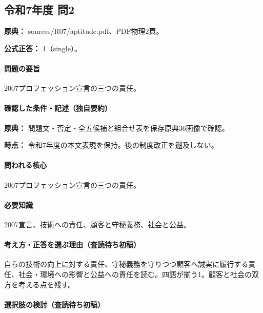 \subsection{令和7年度 問2}
\label{q:r07-reg-apt-02}

\noindent\textbf{原典：} sources/R07/aptitude.pdf、PDF物理2頁。

\textbf{公式正答：} 1（single）。

\paragraph{問題の要旨} 2007プロフェッション宣言の三つの責任。

\paragraph{確認した条件・記述（独自要約）}\mbox{}\par

\noindent\textbf{原典：} 問題文・否定・全五候補と組合せ表を保存原典36画像で確認。\par

\noindent\textbf{時点：} 令和7年度の本文表現を保持。後の制度改正を遡及しない。\par

\paragraph{問われる核心} 2007プロフェッション宣言の三つの責任。

\paragraph{必要知識} 2007宣言、技術への責任、顧客と守秘義務、社会と公益。

\paragraph{考え方・正答を選ぶ理由（査読待ち初稿）} 自らの技術の向上に対する責任、守秘義務を守りつつ顧客へ誠実に履行する責任、社会・環境への影響と公益への責任を読む。四語が揃う1。顧客と社会の双方を考える点を残す。

\paragraph{選択肢の検討（査読待ち初稿）}\mbox{}\par

